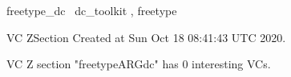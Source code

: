 \documentclass{article}
\begin{document}

\begin{zsection}	 \SECTION freetype\_dc \parents~dc\_toolkit , freetype
\end{zsection}

\newcommand{\appliesTo}{\zbinop{appliesTo}} 
\newcommand{\appliesToNofix}{\zpreop{appliesToNofix}} 

VC ZSection Created at Sun Oct 18 08:41:43 UTC 2020.



 VC Z section "freetypeARGdc" has $0$ interesting VCs.



\end{document}

